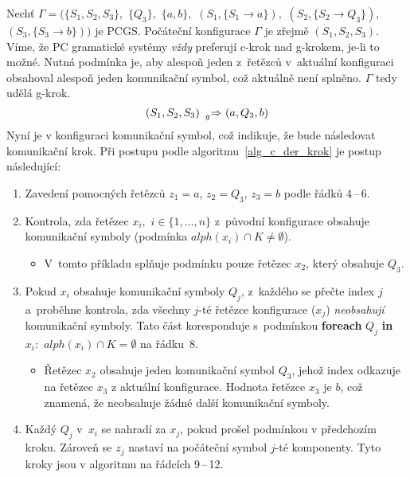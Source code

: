\begin{example}
    Nechť $\Gamma = (\{S_1, S_2, S_3\},$ $\{Q_3\},$ $\{a, b\},$ $(S_1, \{S_1 \rightarrow a\}),$ $(S_2, \{S_2 \rightarrow Q_3\}),$ $(S_3, \{S_3 \rightarrow b\}))$ je PCGS.
    Počáteční konfigurace $\Gamma$ je zřejmě $(S_1, S_2, S_3)$.
    Víme, že PC gramatické systémy \emph{vždy} preferují c-krok nad g-krokem, je-li to možné.
    Nutná podmínka je, aby alespoň jeden z~řetězců v~aktuální konfiguraci obsahoval alespoň jeden komunikační symbol, což aktuálně není splněno.
    $\Gamma$ tedy udělá g-krok.
     \begin{equation*}
    (S_1, S_2, S_3) \ \prescript{}{g}{\Rightarrow} \ (a, Q_3, b)
     \end{equation*}
     Nyní je v konfiguraci komunikační symbol, což indikuje, že bude následovat komunikační krok.
     Při postupu podle algoritmu~\ref{alg_c_der_krok} je postup následující:
     \begin{enumerate}
        \item Zavedení pomocných řetězců $z_1 = a$, $z_2 = Q_3$, $z_3 = b$ podle řádků 4\,--\,6.
        \item Kontrola, zda řetězec $x_i,$ $i \in \{1, \ldots, n\}$ z~původní konfigurace obsahuje komunikační symboly (podmínka $alph(x_i) \cap K \neq \emptyset$).
        \begin{itemize}[label=$\circ$]
            \item V~tomto příkladu splňuje podmínku pouze řetězec $x_2$, který obsahuje $Q_3$.
        \end{itemize}
        \item Pokud $x_i$ obsahuje komunikační symboly $Q_j$, z~každého se přečte index $j$ a~proběhne kontrola, zda všechny $j$-té řetězce konfigurace ($x_j$) \emph{neobsahují} komunikační symboly.
        Tato část koresponduje s~podmínkou \textbf{foreach} $Q_j$ \textbf{in} $x_i:$ $alph(x_i) \cap K = \emptyset$ na řádku~8.
        \begin{itemize}[label=$\circ$]
            \item Řetězec $x_2$ obsahuje jeden komunikační symbol $Q_3$, jehož index odkazuje na řetězec $x_3$ z aktuální konfigurace. Hodnota řetězce $x_3$ je $b$, což znamená, že neobsahuje žádné další komunikační symboly.
        \end{itemize}
        \item Každý $Q_j$ v~$x_i$ se nahradí za $x_j$, pokud prošel podmínkou v předchozím kroku.
        Zároveň se $z_j$ nastaví na počáteční symbol $j$-té komponenty.
        Tyto kroky jsou v algoritmu na řádcích 9\,--\,12.

\end{enumerate}
\end{example}
